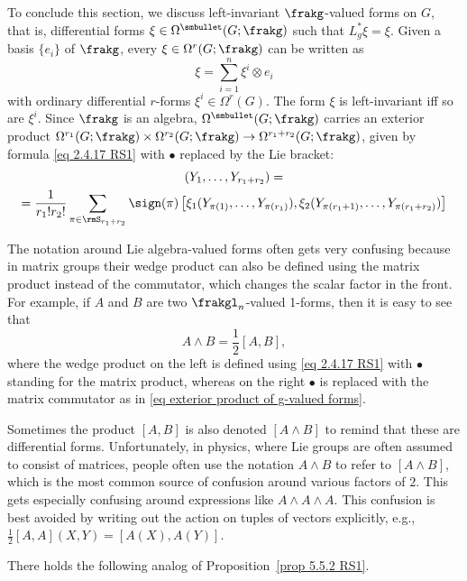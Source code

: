 To conclude this section, we discuss left-invariant $\frakg$-valued forms on $G$, that is, differential forms $\xi\in\Omega^{\smbullet }(G;\frakg)$ such that $L^\ast_g\xi=\xi$. Given a basis $\{e_i\}$ of $\frakg$, every $\xi\in\Omega^r(G;\frakg)$ can be written as
\[\xi=\sum_{i=1}^n\xi^i\otimes e_i\]
with ordinary differential $r$-forms $\xi^i\in\Omega^r(G)$. The form $\xi$ is left-invariant iff so are $\xi^i$. Since $\frakg$ is an algebra, $\Omega^{\smbullet }(G;\frakg)$ carries an exterior product $\Omega^{r_1}(G;\frakg)\times \Omega^{r_2}(G;\frakg)\to \Omega^{r_1+r_2}(G;\frakg)$, given by formula \eqref{eq 2.4.17 RS1} with $\bullet$ replaced by the Lie bracket:
\begin{multline}
    [\xi_1, \xi_2](Y_1,\ldots,Y_{r_1+r_2})=\\
    =\frac{1}{r_1!r_2!}\sum_{\pi\in \rmS_{r_1+r_2}} \sign(\pi)\left[\xi_1(Y_{\pi(1)},\ldots,Y_{\pi(r_1)}), 
    \xi_2(Y_{\pi(r_1+1)},\ldots,Y_{\pi(r_1+r_2)})\right]\label{eq exterior product of g-valued forms}
\end{multline}


\begin{rem}\label{rem lie alg val forms}
    The notation around Lie algebra-valued forms often gets very confusing because in matrix groups their wedge product can also be defined using the matrix product instead of the commutator, which changes the scalar factor in the front. For example, if $A$ and $B$ are two $\frakgl_n$-valued 1-forms, then it is easy to see that
    \[A\wedge B=\frac12 [A,B],\]
    where the wedge product on the left is defined using \eqref{eq 2.4.17 RS1} with $\bullet$ standing for the matrix product, whereas on the right $\bullet$ is replaced with the matrix commutator as in \eqref{eq exterior product of g-valued forms}.

    Sometimes the product $[A,B]$ is also denoted $[A\wedge B]$ to remind that these are differential forms. Unfortunately, in physics, where Lie groups are often assumed to consist of matrices, people often use the notation $A\wedge B$ to refer to $[A\wedge B]$, which is the most common source of confusion around various factors of $2$. This gets especially confusing around expressions like $A\wedge A\wedge A$. This confusion is best avoided by writing out the action on tuples of vectors explicitly, e.g., $\frac12[A,A](X,Y)=[A(X),A(Y)]$.
\end{rem}


There holds the following analog of Proposition~\ref{prop 5.5.2 RS1}.

